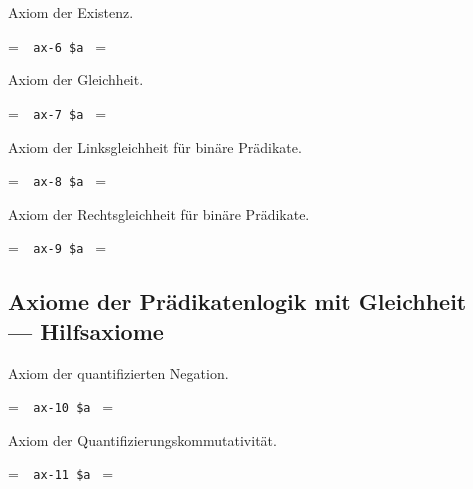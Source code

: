 \noindent Axiom der Existenz.

\setbox\startprefix=\hbox{\tt \ \ ax-6\ \$a\ }
\setbox\contprefix=\hbox{\tt \ \ \ \ \ \ \ \ \ \ }
\startm
\m{\vdash}\m{(}\m{\forall}\m{(}\m{=}\m{\rightarrow}\m{\forall}
\m{\varphi}\m{)}\m{\rightarrow}\m{\varphi}\m{)}
\endm

\noindent Axiom der Gleichheit.

\setbox\startprefix=\hbox{\tt \ \ ax-7\ \$a\ }
\setbox\contprefix=\hbox{\tt \ \ \ \ \ \ \ \ \ \ }
\startm
\m{\vdash}\m{(}\m{=}\m{\rightarrow}\m{(}\m{=}\m{
\rightarrow}\m{=}\m{)}\m{)}
\endm

\noindent Axiom der Linksgleichheit für binäre Prädikate.

\setbox\startprefix=\hbox{\tt \ \ ax-8\ \$a\ }
\setbox\contprefix=\hbox{\tt \ \ \ \ \ \ \ \ \ \ \ }
\startm
\m{\vdash}\m{(}\m{=}\m{\rightarrow}\m{(}\m{\in}\m{
\rightarrow}\m{\in}\m{)}\m{)}
\endm

\noindent Axiom der Rechtsgleichheit für binäre Prädikate.

\setbox\startprefix=\hbox{\tt \ \ ax-9\ \$a\ }
\setbox\contprefix=\hbox{\tt \ \ \ \ \ \ \ \ \ \ \ }
\startm
\m{\vdash}\m{(}\m{=}\m{\rightarrow}\m{(}\m{\in}\m{
\rightarrow}\m{\in}\m{)}\m{)}
\endm


\subsection{Axiome der Prädikatenlogik mit Gleichheit\\--- Hilfsaxiome}

\noindent Axiom der quantifizierten Negation.

\setbox\startprefix=\hbox{\tt \ \ ax-10\ \$a\ }
\setbox\contprefix=\hbox{\tt \ \ \ \ \ \ \ \ \ \ }
\startm
\m{\vdash}\m{(}\m{\lnot}\m{\forall}\m{\lnot}\m{\forall}\m{\varphi}\m{
\rightarrow}\m{\varphi}\m{)}
\endm

\noindent Axiom der Quantifizierungskommutativität.

\setbox\startprefix=\hbox{\tt \ \ ax-11\ \$a\ }
\setbox\contprefix=\hbox{\tt \ \ \ \ \ \ \ \ \ \ }
\startm
\m{\vdash}\m{(}\m{\forall}\m{\forall}\m{\varphi}\m{\rightarrow}\m{
\forall}\m{\forall}\m{\varphi}\m{)}
\endm

